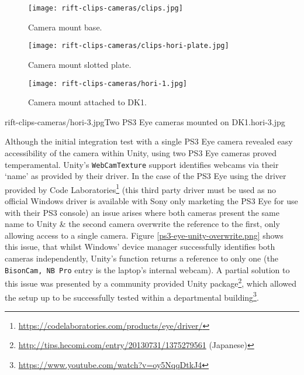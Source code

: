 \begin{figure}[h]
    \centering
    \begin{minipage}{.32\textwidth}
        \centering
        \texttt{[image: rift-clips-cameras/clips.jpg]}
        \caption{Camera mount base.}
        \label{clips.jpg}
    \end{minipage}%
    \hspace{.01\textwidth}
    \begin{minipage}{0.32\textwidth}
        \centering
        \texttt{[image: rift-clips-cameras/clips-hori-plate.jpg]}
        \caption{Camera mount slotted plate.}
        \label{clips-hori-plate.jpg}
    \end{minipage}%
    \hspace{.01\textwidth}
    \begin{minipage}{0.32\textwidth}
        \centering
        \texttt{[image: rift-clips-cameras/hori-1.jpg]}
        \caption{Camera mount attached to DK1.}
        \label{hori-1.jpg}
    \end{minipage}
\end{figure}

       {rift-clips-cameras/hori-3.jpg}{Two PS3 Eye cameras mounted on DK1.}{hori-3.jpg}

Although the initial integration test with a single PS3 Eye camera revealed easy accessibility of the camera within Unity, using two PS3 Eye cameras proved temperamental. Unity's \texttt{WebCamTexture} support identifies webcams via their `name' as provided by their driver. In the case of the PS3 Eye using the driver provided by Code Laboratories\footnote{\url{https://codelaboratories.com/products/eye/driver/}} (this third party driver must be used as no official Windows driver is available with Sony only marketing the PS3 Eye for use with their PS3 console) an issue arises where both cameras present the same name to Unity \& the second camera overwrite the reference to the first, only allowing access to a single camera. Figure \ref{ps3-eye-unity-overwrite.png} shows this issue, that whilst Windows' device manager successfully identifies both cameras independently, Unity's  function returns a reference to only one (the \texttt{BisonCam, NB Pro} entry is the laptop's internal webcam). A partial solution to this issue was presented by a community provided Unity package\footnote{\url{http://tips.hecomi.com/entry/20130731/1375279561} (Japanese)}, which allowed the setup up to be successfully tested within a departmental building\footnote{\url{https://www.youtube.com/watch?v=oy5NqqDtkJ4}}.

